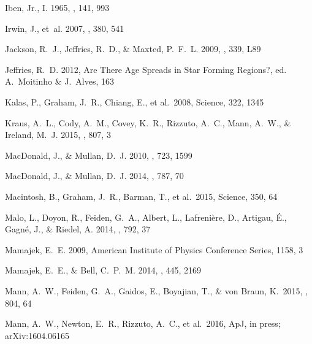 \begin{thebibliography}{56}
{Iben}, Jr., I. 1965, \apj, 141, 993

Irwin, J., {et~al.} 2007, \mnras, 380, 541

{Jackson}, R.~J., {Jeffries}, R.~D., \& {Maxted}, P.~F.~L. 2009, \mnras, 339,
  L89

{Jeffries}, R.~D. 2012, {Are There Age Spreads in Star Forming Regions?}, ed.
  A.~{Moitinho} \& J.~{Alves}, 163
  
 Kalas, P., Graham, J.~R., 
Chiang, E., et al.\ 2008, Science, 322, 1345

{Kraus}, A.~L., {Cody}, A.~M., {Covey}, K.~R., {Rizzuto}, A.~C., {Mann}, A.~W.,
  \& {Ireland}, M.~J. 2015, \apj, 807, 3

MacDonald, J., \& Mullan, D.~J. 2010, \apj, 723, 1599

{MacDonald}, J., \& {Mullan}, D.~J. 2014, \apj, 787, 70

 Macintosh, B., Graham, J.~R., Barman, T., et al.\ 2015, Science, 350, 64

{Malo}, L., {Doyon}, R., {Feiden}, G.~A., {Albert}, L., {Lafreni{\`e}re}, D.,
  {Artigau}, {\'E}., {Gagn{\'e}}, J., \& {Riedel}, A. 2014, \apj, 792, 37

Mamajek, E.~E. 2009, American Institute of Physics Conference Series, 1158, 3

{Mamajek}, E.~E., \& {Bell}, C.~P.~M. 2014, \mnras, 445, 2169

 Mann, A.~W., Feiden, G.~A., Gaidos, E., Boyajian, T., \& von Braun, K.\ 2015, \apj, 804, 64 

 Mann, A.~W., Newton, E.~R., Rizzuto, A.~C., et al.\ 2016, ApJ, in press; arXiv:1604.06165 


\end{thebibliography}
